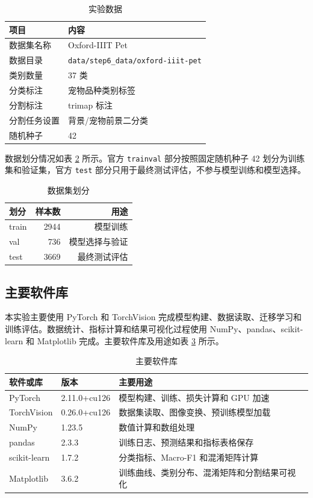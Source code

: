 \documentclass[UTF8,a4paper,12pt]{ctexart}
\begin{document}
\begin{table}[H]
\centering
\caption{实验数据}
\label{tab:dataset-info}
\begin{tabular}{p{}p{}}
\toprule
项目 & 内容 \\
\midrule
数据集名称 & Oxford-IIIT Pet \\
数据目录 & \texttt{data/step6\_data/oxford-iiit-pet} \\
类别数量 & 37 类 \\
分类标注 & 宠物品种类别标签 \\
分割标注 & trimap 标注 \\
分割任务设置 & 背景/宠物前景二分类 \\
随机种子 & 42 \\
\bottomrule
\end{tabular}
\end{table}

数据划分情况如表 \ref{tab:data-split} 所示。官方 \texttt{trainval} 部分按照固定随机种子 42 划分为训练集和验证集，官方 \texttt{test} 部分只用于最终测试评估，不参与模型训练和模型选择。

\begin{table}[H]
\centering
\caption{数据集划分}
\label{tab:data-split}
\begin{tabular}{lrr}
\toprule
划分 & 样本数 & 用途 \\
\midrule
train & 2944 & 模型训练 \\
val & 736 & 模型选择与验证 \\
test & 3669 & 最终测试评估 \\
\bottomrule
\end{tabular}
\end{table}

\subsection{主要软件库}

本实验主要使用 PyTorch 和 TorchVision 完成模型构建、数据读取、迁移学习和训练评估。数据统计、指标计算和结果可视化过程使用 NumPy、pandas、scikit-learn 和 Matplotlib 完成。主要软件库及用途如表 \ref{tab:software-libs} 所示。

\begin{table}[H]
\centering
\caption{主要软件库}
\label{tab:software-libs}
\begin{tabular}{p{}p{}p{}}
\toprule
软件或库 & 版本 & 主要用途 \\
\midrule
PyTorch & 2.11.0+cu126 & 模型构建、训练、损失计算和 GPU 加速 \\
TorchVision & 0.26.0+cu126 & 数据集读取、图像变换、预训练模型加载 \\
NumPy & 1.23.5 & 数值计算和数组处理 \\
pandas & 2.3.3 & 训练日志、预测结果和指标表格保存 \\
scikit-learn & 1.7.2 & 分类指标、Macro-F1 和混淆矩阵计算 \\
Matplotlib & 3.6.2 & 训练曲线、类别分布、混淆矩阵和分割结果可视化 \\
\bottomrule
\end{tabular}
\end{table}
\end{document}
